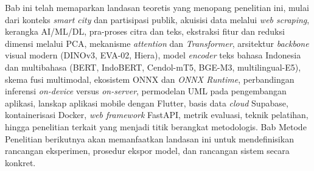 \bigskip

Bab ini telah memaparkan landasan teoretis yang menopang penelitian ini, mulai dari konteks \textit{smart city} dan partisipasi publik, akuisisi data melalui \textit{web scraping}, kerangka AI/ML/DL, pra-proses citra dan teks, ekstraksi fitur dan reduksi dimensi melalui PCA, mekanisme \textit{attention} dan \textit{Transformer}, arsitektur \textit{backbone} visual modern (DINOv3, EVA-02, Hiera), model \textit{encoder} teks bahasa Indonesia dan multibahasa (BERT, IndoBERT, Cendol-mT5, BGE-M3, multilingual-E5), skema fusi multimodal, ekosistem ONNX dan \textit{ONNX Runtime}, perbandingan inferensi \textit{on-device} versus \textit{on-server}, permodelan UML pada pengembangan aplikasi, lanskap aplikasi mobile dengan Flutter, basis data \textit{cloud} Supabase, kontainerisasi Docker, \textit{web framework} FastAPI, metrik evaluasi, teknik pelatihan, hingga penelitian terkait yang menjadi titik berangkat metodologis. Bab Metode Penelitian berikutnya akan memanfaatkan landasan ini untuk mendefinisikan rancangan eksperimen, prosedur ekspor model, dan rancangan sistem secara konkret.
